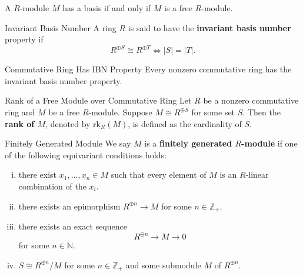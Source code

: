 \begin{proposition}{}{}
    A $R$-module $M$ has a basis if and only if $M$ is a free $R$-module.
\end{proposition}

\begin{definition}{Invariant Basis Number}{}
    A ring $R$ is said to have the \textbf{invariant basis number} property if 
    \[
    R^{\oplus S}\cong R^{\oplus T}\iff |S|=|T|.
    \]
\end{definition}

\begin{proposition}{Commutative Ring Has IBN Property}{}
    Every nonzero commutative ring has the invariant basis number property.
\end{proposition}

\begin{definition}{Rank of a Free Module over Commutative Ring}{}
    Let $R$ be a nonzero commutative ring and $M$ be a free $R$-module. Suppose $M\cong R^{\oplus S}$ for some set $S$. Then the \textbf{rank of $M$}, denoted by $\mathrm{rk}_R(M)$, is defined as the cardinality of $S$.
\end{definition}



\begin{definition}{Finitely Generated Module}{}
    We say $M$ is a \textbf{finitely generated $R$-module} if 
    one of the following equivariant conditions holds:
    \begin{enumerate}[(i)]
        \item there exist $x_1, \ldots, x_n \in M$ such that every element of $M$ is an $R$-linear combination of the $x_i$. 
        \item there exists an epimorphism $R^{\oplus n} \rightarrow M$ for some $n \in \mathbb{Z}_+$.
        \item there exists an exact sequence
        \[
        R^{\oplus n}  \rightarrow M \rightarrow 0
        \]
        for some $n\in \mathbb{N}$.
        \item $S\cong R^{\oplus n}/M$ for some $n\in \mathbb{Z}_+$ and some submodule $M$ of $R^{\oplus n}$.
    \end{enumerate}
\end{definition}

